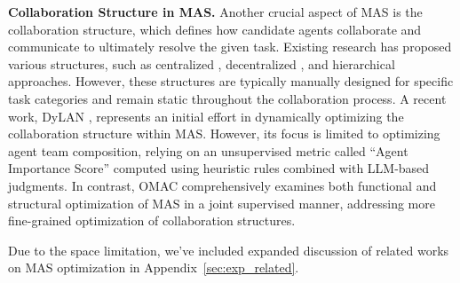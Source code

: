 \noindent \textbf{Collaboration Structure in MAS.} Another crucial aspect of MAS is the collaboration structure, which defines how candidate agents collaborate and communicate to ultimately resolve the given task. Existing research has proposed various structures, such as centralized \cite{jiang2023llm}, decentralized \cite{liang2023encouraging}, and hierarchical \cite{chatllm-network} approaches. However, these structures are typically manually designed for specific task categories and remain static throughout the collaboration process. A recent work, DyLAN \cite{dylan}, represents an initial effort in dynamically optimizing the collaboration structure within MAS. However, its focus is limited to
optimizing agent team composition, relying on an unsupervised metric called ``Agent Importance Score'' computed using heuristic rules combined with LLM-based judgments. In contrast, OMAC comprehensively examines both functional and structural optimization of MAS in a joint supervised manner, addressing more fine-grained optimization of collaboration structures.

Due to the space limitation, we've included expanded discussion of related works on MAS optimization in Appendix~\ref{sec:exp_related}.








